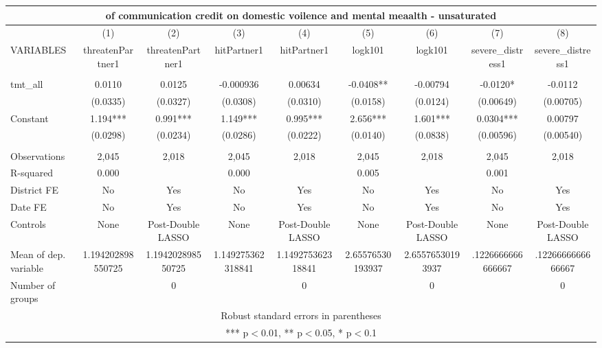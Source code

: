 \documentclass[]{article}
\begin{document}
\begin{tabular}{lcccccccc}
\multicolumn{9}{c}{of communication credit on domestic voilence and mental meaalth - unsaturated} \\ \hline
 & (1) & (2) & (3) & (4) & (5) & (6) & (7) & (8) \\
VARIABLES & threatenPartner1 & threatenPartner1 & hitPartner1 & hitPartner1 & logk101 & logk101 & severe\_distress1 & severe\_distress1 \\ \hline
 &  &  &  &  &  &  &  &  \\
tmt\_all & 0.0110 & 0.0125 & -0.000936 & 0.00634 & -0.0408** & -0.00794 & -0.0120* & -0.0112 \\
 & (0.0335) & (0.0327) & (0.0308) & (0.0310) & (0.0158) & (0.0124) & (0.00649) & (0.00705) \\
Constant & 1.194*** & 0.991*** & 1.149*** & 0.995*** & 2.656*** & 1.601*** & 0.0304*** & 0.00797 \\
 & (0.0298) & (0.0234) & (0.0286) & (0.0222) & (0.0140) & (0.0838) & (0.00596) & (0.00540) \\
 &  &  &  &  &  &  &  &  \\
Observations & 2,045 & 2,018 & 2,045 & 2,018 & 2,045 & 2,018 & 2,045 & 2,018 \\
R-squared & 0.000 &  & 0.000 &  & 0.005 &  & 0.001 &  \\
District FE & No & Yes & No & Yes & No & Yes & No & Yes \\
Date FE & No & Yes & No & Yes & No & Yes & No & Yes \\
Controls & None & Post-Double LASSO & None & Post-Double LASSO & None & Post-Double LASSO & None & Post-Double LASSO \\
Mean of dep. variable & 1.194202898550725 & 1.194202898550725 & 1.149275362318841 & 1.149275362318841 & 2.65576530193937 & 2.65576530193937 & .1226666666666667 & .1226666666666667 \\
 Number of groups &  & 0 &  & 0 &  & 0 &  & 0 \\ \hline
\multicolumn{9}{c}{ Robust standard errors in parentheses} \\
\multicolumn{9}{c}{ *** p$<$0.01, ** p$<$0.05, * p$<$0.1} \\
\end{tabular}
\end{document}
